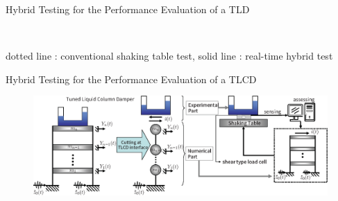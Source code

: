 \documentclass[usepdftitle=false]{beamer}
\begin{document}
\begin{frame}{Hybrid Testing for the Performance Evaluation of a TLD}
\begin{figure}[!ht]
\centering
 \\
\label{fig:3-9}
\end{figure}
dotted line : conventional shaking table test, solid line : real-time hybrid test
\end{frame}











\begin{frame}{Hybrid Testing for the Performance Evaluation of a TLCD}
\begin{figure}[ht]
\centering
\includegraphics[width=1\textwidth] {figure/4-1.eps}
\label{fig:4-1}
\end{figure}
\end{frame}
\end{document}
